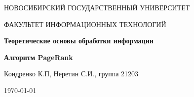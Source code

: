 \begin{center}
	{\LARGE \textsc{НОВОСИБИРСКИЙ ГОСУДАРСТВЕННЫЙ УНИВЕРСИТЕТ}\par}
	{\textsc{ФАКУЛЬТЕТ ИНФОРМАЦИОННЫХ ТЕХНОЛОГИЙ}\par}
	
	\vspace{3cm}
	
	{\huge\bfseries Теоретические основы обработки информации\par}
	
	\vspace{1cm}
	
	{\Large\bfseries Алгоритм PageRank\par}
	
	\vspace{10cm}
	
	\begin{flushright}
		Кондренко К.П, Неретин С.И., группа 21203
	\end{flushright}
	
	\vfill
	
	{\large \today\par}
\end{center}

